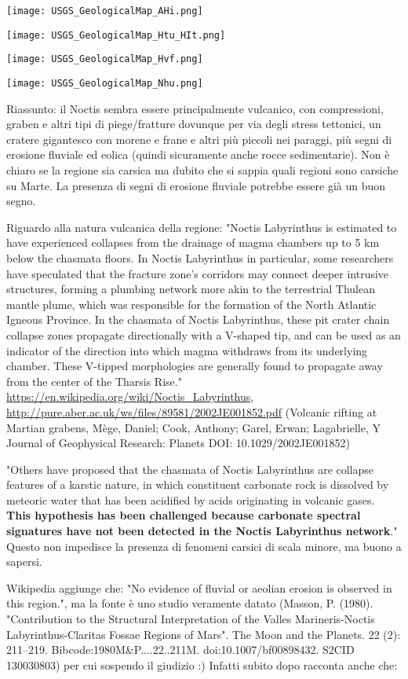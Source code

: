 \documentclass[a4paper,10pt,openany,oneside]{memoir}
\begin{document}
\texttt{[image: USGS\_GeologicalMap\_AHi.png]}

\texttt{[image: USGS\_GeologicalMap\_Htu\_HIt.png]}

\texttt{[image: USGS\_GeologicalMap\_Hvf.png]}

\texttt{[image: USGS\_GeologicalMap\_Nhu.png]}

Riassunto: il Noctis sembra essere principalmente vulcanico, con compressioni, graben e altri tipi di piege/fratture dovunque per via degli stress tettonici, un cratere gigantesco con morene e frane e altri più piccoli nei paraggi, più segni di erosione fluviale ed eolica (quindi sicuramente anche rocce sedimentarie). Non è chiaro se la regione sia carsica ma dubito che si sappia quali regioni sono carsiche su Marte. La presenza di segni di erosione fluviale potrebbe essere già un buon segno.

Riguardo alla natura vulcanica della regione: "Noctis Labyrinthus is estimated to have experienced collapses from the drainage of magma chambers up to 5 km below the chasmata floors. In Noctis Labyrinthus in particular, some researchers have speculated that the fracture zone's corridors may connect deeper intrusive structures, forming a plumbing network more akin to the terrestrial Thulean mantle plume, which was responsible for the formation of the North Atlantic Igneous Province. In the chasmata of Noctis Labyrinthus, these pit crater chain collapse zones propagate directionally with a V-shaped tip, and can be used as an indicator of the direction into which magma withdraws from its underlying chamber. These V-tipped morphologies are generally found to propagate away from the center of the Tharsis Rise." \url{https://en.wikipedia.org/wiki/Noctis_Labyrinthus}, \url{http://pure.aber.ac.uk/ws/files/89581/2002JE001852.pdf} (Volcanic rifting at Martian grabens, Mège, Daniel; Cook, Anthony; Garel, Erwan; Lagabrielle, Y Journal of Geophysical Research: Planets DOI: 10.1029/2002JE001852)

"Others have proposed that the chasmata of Noctis Labyrinthus are collapse features of a karstic nature, in which constituent carbonate rock is dissolved by meteoric water that has been acidified by acids originating in volcanic gases. \textbf{This hypothesis has been challenged because carbonate spectral signatures have not been detected in the Noctis Labyrinthus network}." Questo non impedisce la presenza di fenomeni carsici di scala minore, ma buono a sapersi.

Wikipedia aggiunge che: "No evidence of fluvial or aeolian erosion is observed in this region.", ma la fonte è uno studio veramente datato (Masson, P. (1980). "Contribution to the Structural Interpretation of the Valles Marineris-Noctis Labyrinthus-Claritas Fossae Regions of Mars". The Moon and the Planets. 22 (2): 211–219. Bibcode:1980M\&P....22..211M. doi:10.1007/bf00898432. S2CID 130030803) per cui sospendo il giudizio :) Infatti subito dopo racconta anche che:
\end{document}
